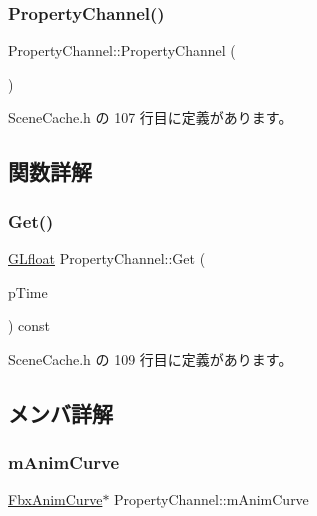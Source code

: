 \subsubsection{\texorpdfstring{Property\+Channel()}{PropertyChannel()}}
{\footnotesize\ttfamily Property\+Channel\+::\+Property\+Channel (\begin{DoxyParamCaption}{ }\end{DoxyParamCaption})\hspace{0.3cm}{\ttfamily [inline]}}



 Scene\+Cache.\+h の 107 行目に定義があります。



\subsection{関数詳解}
\mbox{\label{struct_property_channel_ad3ad08b01dc4816c8bd47609070018ce}} 
\subsubsection{\texorpdfstring{Get()}{Get()}}
{\footnotesize\ttfamily \hyperlink{glew_8h_a31aeedaeef29442c9c015ab355c8f5ab}{G\+Lfloat} Property\+Channel\+::\+Get (\begin{DoxyParamCaption}\item[{const \hyperlink{class_fbx_time}{Fbx\+Time} \&}]{p\+Time }\end{DoxyParamCaption}) const\hspace{0.3cm}{\ttfamily [inline]}}



 Scene\+Cache.\+h の 109 行目に定義があります。



\subsection{メンバ詳解}
\mbox{\label{struct_property_channel_a2cdb65a9f9ace8380622e4a60f0fb835}} 
\subsubsection{\texorpdfstring{m\+Anim\+Curve}{mAnimCurve}}
{\footnotesize\ttfamily \hyperlink{class_fbx_anim_curve}{Fbx\+Anim\+Curve}$\ast$ Property\+Channel\+::m\+Anim\+Curve}



